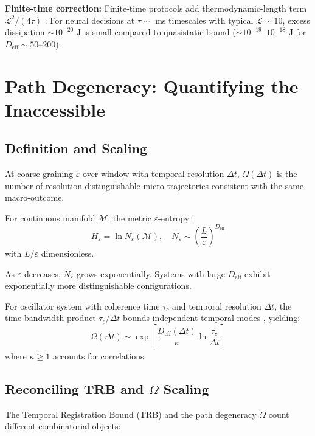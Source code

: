 \documentclass[12pt]{article}
\numberwithin{equation}{section}
\begin{document}
\textbf{Finite-time correction:} Finite-time protocols add thermodynamic-length term $\mathcal{L}^2/(4\tau)$ \cite{sivak2012}. For neural decisions at $\tau \sim$ ms timescales with typical $\mathcal{L} \sim 10$, excess dissipation $\sim 10^{-20}$ J is small compared to quasistatic bound ($\sim 10^{-19}$--$10^{-18}$ J for $D_{\text{eff}} \sim 50$--$200$).

\section{Path Degeneracy: Quantifying the Inaccessible}

\subsection{Definition and Scaling}

At coarse-graining $\varepsilon$ over window with temporal resolution $\Delta t$, $\Omega(\Delta t)$ is the number of resolution-distinguishable micro-trajectories consistent with the same macro-outcome.

For continuous manifold $\mathcal{M}$, the metric $\varepsilon$-entropy \cite{kolmogorov1959}:
\begin{equation}
H_\varepsilon = \ln N_\varepsilon(\mathcal{M}), \quad N_\varepsilon \sim \left(\frac{L}{\varepsilon}\right)^{D_{\text{eff}}}
\end{equation}
with $L/\varepsilon$ dimensionless.

As $\varepsilon$ decreases, $N_\varepsilon$ grows exponentially. Systems with large $D_{\text{eff}}$ exhibit exponentially more distinguishable configurations.

For oscillator system with coherence time $\tau_c$ and temporal resolution $\Delta t$, the time-bandwidth product $\tau_c/\Delta t$ bounds independent temporal modes \cite{slepian1961}, yielding:
\begin{equation}
\Omega(\Delta t) \sim \exp\left[\frac{D_{\text{eff}}(\Delta t)}{\kappa} \ln\frac{\tau_c}{\Delta t}\right]
\end{equation}
where $\kappa \geq 1$ accounts for correlations.

\subsection{Reconciling TRB and $\Omega$ Scaling}

The Temporal Registration Bound (TRB) and the path degeneracy $\Omega$ count different combinatorial objects:
\end{document}
